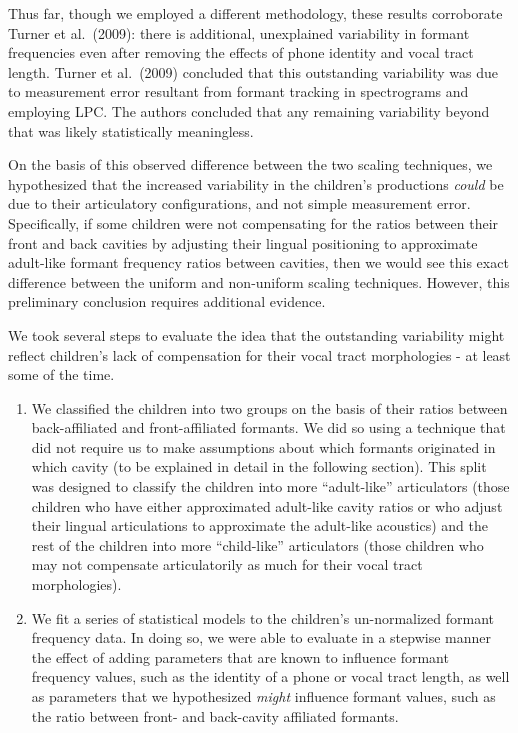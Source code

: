 \documentclass[
]{article}
\begin{document}
Thus far, though we employed a different methodology, these results corroborate Turner et al.~(2009): there is additional, unexplained variability in formant frequencies even after removing the effects of phone identity and vocal tract length. Turner et al.~(2009) concluded that this outstanding variability was due to measurement error resultant from formant tracking in spectrograms and employing LPC. The authors concluded that any remaining variability beyond that was likely statistically meaningless.

On the basis of this observed difference between the two scaling techniques, we hypothesized that the increased variability in the children's productions \emph{could} be due to their articulatory configurations, and not simple measurement error. Specifically, if some children were not compensating for the ratios between their front and back cavities by adjusting their lingual positioning to approximate adult-like formant frequency ratios between cavities, then we would see this exact difference between the uniform and non-uniform scaling techniques. However, this preliminary conclusion requires additional evidence.

We took several steps to evaluate the idea that the outstanding variability might reflect children's lack of compensation for their vocal tract morphologies - at least some of the time.

\begin{enumerate}
\def\labelenumi{\arabic{enumi}.}
\item
  We classified the children into two groups on the basis of their ratios between back-affiliated and front-affiliated formants. We did so using a technique that did not require us to make assumptions about which formants originated in which cavity (to be explained in detail in the following section). This split was designed to classify the children into more ``adult-like'' articulators (those children who have either approximated adult-like cavity ratios or who adjust their lingual articulations to approximate the adult-like acoustics) and the rest of the children into more ``child-like'' articulators (those children who may not compensate articulatorily as much for their vocal tract morphologies).
\item
  We fit a series of statistical models to the children's un-normalized formant frequency data. In doing so, we were able to evaluate in a stepwise manner the effect of adding parameters that are known to influence formant frequency values, such as the identity of a phone or vocal tract length, as well as parameters that we hypothesized \emph{might} influence formant values, such as the ratio between front- and back-cavity affiliated formants.
\end{enumerate}
\end{document}
